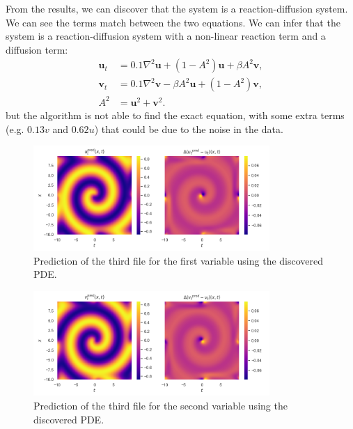 \documentclass[unicode,11pt,a4paper,oneside,numbers=endperiod,openany]{scrartcl}
\begin{document}
From the results, we can discover that the system is a reaction-diffusion
system. We can see the terms match between the two equations. 
We can infer that the system is a reaction-diffusion system with a non-linear
reaction term and a diffusion term:
\begin{align}
    \mathbf{u}_t &= 0.1 \nabla^2 \mathbf{u} + (1 - A^2) \mathbf{u} + \beta A^2 \mathbf{v}, \\
    \mathbf{v}_t &= 0.1 \nabla^2 \mathbf{v} - \beta A^2 \mathbf{u} + (1 - A^2) \mathbf{v}, \\
    A^2 &= \mathbf{u}^2 + \mathbf{v}^2.
\end{align}
but the algorithm is not able to find the exact equation, with some extra terms
(e.g. $0.13v$ and $0.62u$) that could be due to the noise in the data.
\begin{figure}[h]
    \centering
    \includegraphics[width=0.8\textwidth]{../Task2/figures/results_u_3.png}
    \caption{Prediction of the third file for the first variable using the discovered PDE.}
\end{figure}

\begin{figure}[h]
    \centering
    \includegraphics[width=0.8\textwidth]{../Task2/figures/results_v_3.png}
    \caption{Prediction of the third file for the second variable using the discovered PDE.}
\end{figure}

\end{document}
